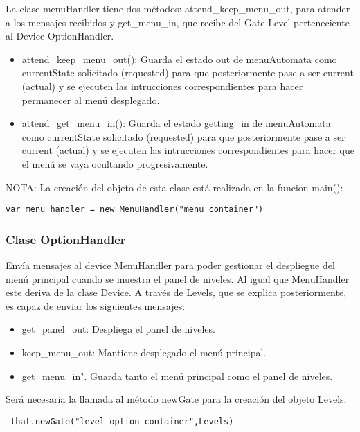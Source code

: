 La clase menuHandler tiene dos métodos: attend\_keep\_menu\_out, para atender a los mensajes recibidos y get\_menu\_in, que recibe del 
Gate Level perteneciente al Device OptionHandler.


\begin{itemize}
 \item attend\_keep\_menu\_out(): Guarda el estado out de menuAutomata como currentState solicitado 
 (requested) para que posteriormente pase a ser current (actual) y se ejecuten las intrucciones 
 correspondientes para hacer permanecer al menú desplegado.

 \item attend\_get\_menu\_in(): Guarda el estado getting\_in de menuAutomata como currentState 
 solicitado (requested)  para que posteriormente pase a ser current (actual) y se ejecuten las 
 intrucciones correspondientes para hacer que el menú se vaya ocultando progresivamente.
\end{itemize}

NOTA: La creación del objeto de esta clase está realizada en la funcion main():
\begin{verbatim}
var menu_handler = new MenuHandler("menu_container")
\end{verbatim}

\subsubsection{Clase OptionHandler}
\label{subsubsection:option_handler}

Envía mensajes al device MenuHandler para poder gestionar el despliegue del menú principal cuando se muestra el panel de niveles. 
Al igual que MenuHandler este deriva de la clase Device. A través de Levels, que se explica posteriormente, es capaz de enviar 
los siguientes mensajes:
\begin{itemize}
 \item get\_panel\_out: Despliega el panel de niveles.

 \item keep\_menu\_out: Mantiene desplegado el menú principal.

 \item get\_menu\_in". Guarda tanto el menú principal como el panel de niveles.
\end{itemize}

Será necesaria la llamada al método newGate para la creación del objeto Levels:
\begin{verbatim}
 that.newGate("level_option_container",Levels)
\end{verbatim}

